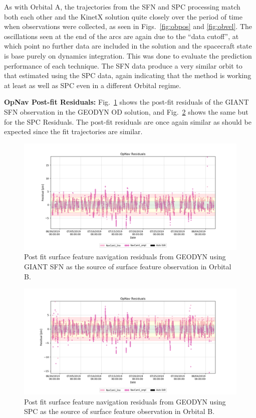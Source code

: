 \documentclass{RPI-SIW}
\begin{document}
As with Orbital A, the trajectories from the SFN and SPC processing match both each other and the KinetX solution quite closely over the period of time when observations were collected, as seen in Figs.~\ref{fig:obpos} and \ref{fig:obvel}.  The oscillations seen at the end of the arcs are again due to the ``data cutoff'', at which point no further data are included in the solution and the spacecraft state is base purely on dynamics integration.  This was done to evaluate the prediction performance of each technique.  The SFN data produce a very similar orbit to that estimated using the SPC data, again indicating that the method is working at least as well as SPC even in a different Orbital regime.

\textbf{OpNav Post-fit Residuals:}
Fig.~\ref{fig:obsfn} shows the post-fit residuals of the GIANT SFN observation in the GEODYN OD solution, and Fig.~\ref{fig:obspc} shows the same but for the SPC Residuals.  The post-fit residuals are once again similar as should be expected since the fit trajectories are similar.
\begin{figure}[htbp]
	\centering
	\includegraphics[width=\columnwidth]{orbitb_sfn.png}
    \caption{Post fit surface feature navigation residuals from GEODYN using GIANT SFN as the source of surface feature observation in Orbital B.}
    \label{fig:obsfn}
\end{figure}
\begin{figure}[htbp]
	\centering
	\includegraphics[width=\columnwidth]{orbitb_spc.png}
    \caption{Post fit surface feature navigation residuals from GEODYN using SPC as the source of surface feature observation in Orbital B.}
    \label{fig:obspc}
\end{figure}
\end{document}
